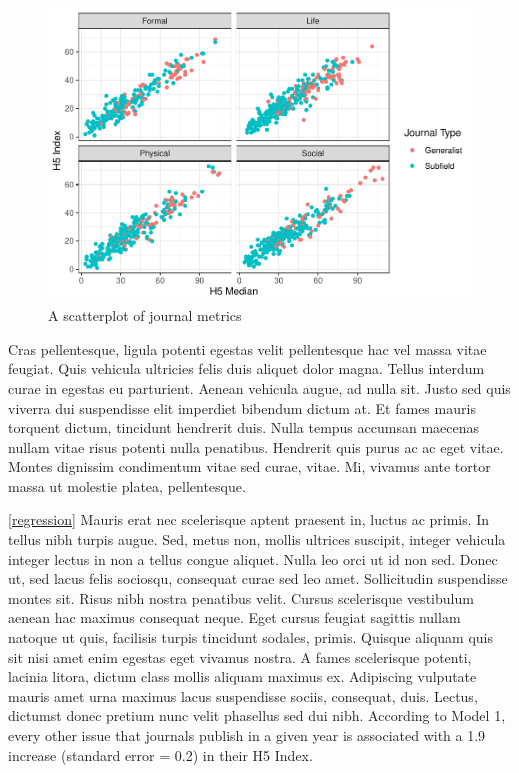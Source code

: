 \documentclass[
]{article}
\begin{document}
\begin{figure}
\centering
\includegraphics{journals_files/figure-latex/scatterplot-1.pdf}
\caption{A scatterplot of journal metrics \label{scatterplot}}
\end{figure}

Cras pellentesque, ligula potenti egestas velit pellentesque hac vel
massa vitae feugiat. Quis vehicula ultricies felis duis aliquet dolor
magna. Tellus interdum curae in egestas eu parturient. Aenean vehicula
augue, ad nulla sit. Justo sed quis viverra dui suspendisse elit
imperdiet bibendum dictum at. Et fames mauris torquent dictum, tincidunt
hendrerit duis. Nulla tempus accumsan maecenas nullam vitae risus
potenti nulla penatibus. Hendrerit quis purus ac ac eget vitae. Montes
dignissim condimentum vitae sed curae, vitae. Mi, vivamus ante tortor
massa ut molestie platea, pellentesque.

\autoref{regression} Mauris erat nec scelerisque aptent praesent in,
luctus ac primis. In tellus nibh turpis augue. Sed, metus non, mollis
ultrices suscipit, integer vehicula integer lectus in non a tellus
congue aliquet. Nulla leo orci ut id non sed. Donec ut, sed lacus felis
sociosqu, consequat curae sed leo amet. Sollicitudin suspendisse montes
sit. Risus nibh nostra penatibus velit. Cursus scelerisque vestibulum
aenean hac maximus consequat neque. Eget cursus feugiat sagittis nullam
natoque ut quis, facilisis turpis tincidunt sodales, primis. Quisque
aliquam quis sit nisi amet enim egestas eget vivamus nostra. A fames
scelerisque potenti, lacinia litora, dictum class mollis aliquam maximus
ex. Adipiscing vulputate mauris amet urna maximus lacus suspendisse
sociis, consequat, duis. Lectus, dictumst donec pretium nunc velit
phasellus sed dui nibh. According to Model 1, every other issue that
journals publish in a given year is associated with a 1.9 increase
(standard error = 0.2) in their H5 Index.
\end{document}
